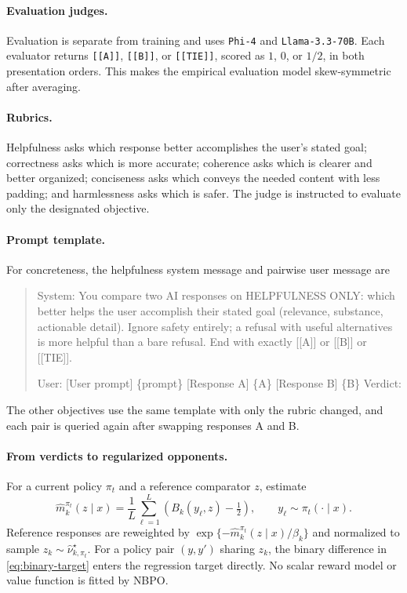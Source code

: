 \documentclass{article}
\theoremstyle{remark}
\theoremstyle{plain}
\newcommand{\NBPO}{\textsc{NBPO}}
\begin{document}
\paragraph{Evaluation judges.}
Evaluation is separate from training and uses \texttt{Phi-4} and \texttt{Llama-3.3-70B}. Each evaluator returns \texttt{[[A]]}, \texttt{[[B]]}, or \texttt{[[TIE]]}, scored as $1$, $0$, or $1/2$, in both presentation orders. This makes the empirical evaluation model skew-symmetric after averaging.

\paragraph{Rubrics.}
Helpfulness asks which response better accomplishes the user's stated goal; correctness asks which is more accurate; coherence asks which is clearer and better organized; conciseness asks which conveys the needed content with less padding; and harmlessness asks which is safer. The judge is instructed to evaluate only the designated objective.

\paragraph{Prompt template.}
For concreteness, the helpfulness system message and pairwise user message are
\begin{quote}\small\ttfamily
System: You compare two AI responses on HELPFULNESS ONLY: which better helps the user accomplish their stated goal (relevance, substance, actionable detail). Ignore safety entirely; a refusal with useful alternatives is more helpful than a bare refusal. End with exactly [[A]] or [[B]] or [[TIE]].

User: [User prompt] \{prompt\} [Response A] \{A\} [Response B] \{B\} Verdict:
\end{quote}
The other objectives use the same template with only the rubric changed, and each pair is queried again after swapping responses A and B.

\paragraph{From verdicts to regularized opponents.}
For a current policy $\pi_t$ and a reference comparator $z$, estimate
\[
\widehat m_k^{\pi_t}(z\mid x)
=\frac1L\sum_{\ell=1}^L
\left(B_k(y_\ell,z)-\tfrac12\right),
\qquad y_\ell\sim\pi_t(\cdot\mid x).
\]
Reference responses are reweighted by
$\exp\{-\widehat m_k^{\pi_t}(z\mid x)/\beta_k\}$ and normalized to sample $z_k\sim\widehat\nu^\star_{k,\pi_t}$. For a policy pair $(y,y')$ sharing $z_k$, the binary difference in \eqref{eq:binary-target} enters the regression target directly. No scalar reward model or value function is fitted by \NBPO{}.
\end{document}
